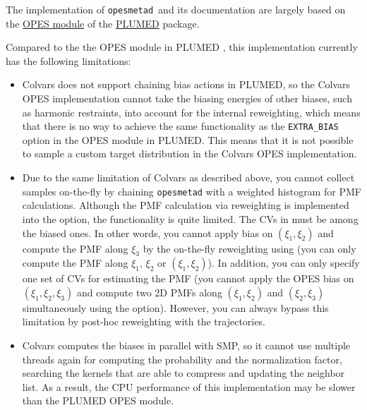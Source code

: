 The implementation of \texttt{opes{\textunderscore}metad}\ and its documentation are largely based on the \href{https://www.plumed.org/doc-master/user-doc/html/_o_p_e_s__m_e_t_a_d__e_x_p_l_o_r_e.html}{OPES module} of the \href{https://www.plumed.org/}{PLUMED} package.


Compared to the the OPES module in PLUMED \cite{tribello_plumed_2014}, this implementation currently has the following limitations:
\begin{itemize}
\item Colvars does not support chaining bias actions in PLUMED, so the Colvars OPES implementation cannot take the biasing energies of other biases, such as harmonic restraints, into account for the internal reweighting, which means that there is no way to achieve the same functionality as the \texttt{EXTRA\_BIAS} option in the OPES module in PLUMED. This means that it is not possible to sample a custom target distribution in the Colvars OPES implementation.
\item Due to the same limitation of Colvars as described above, you cannot collect samples on-the-fly by chaining \texttt{opes{\textunderscore}metad} with a weighted histogram for PMF calculations. Although the PMF calculation via reweighting is implemented into the  option, the functionality is quite limited. The CVs in  must be among the biased ones. In other words, you cannot apply bias on $(\xi_1, \xi_2)$ and compute the PMF along $\xi_3$ by the on-the-fly reweighting using  (you can only compute the PMF along $\xi_1$, $\xi_2$ or $(\xi_1, \xi_2)$). In addition, you can only specify one set of CVs for estimating the PMF (you cannot apply the OPES bias on $(\xi_1, \xi_2, \xi_3)$ and compute two 2D PMFs along $(\xi_1, \xi_2)$ and $(\xi_2, \xi_3)$ simultaneously using the  option). However, you can always bypass this limitation by post-hoc reweighting with the trajectories.
\item Colvars computes the biases in parallel with SMP, so it cannot use multiple threads again for computing the probability and the normalization factor, searching the kernels that are able to compress and updating the neighbor list. As a result, the CPU performance of this implementation may be slower than the PLUMED OPES module.
\end{itemize}

